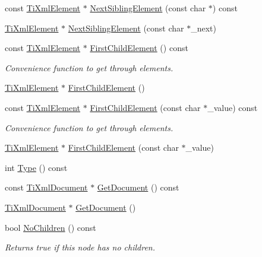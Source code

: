 \begin{DoxyCompactItemize}
\item 
const \hyperlink{class_ti_xml_element}{Ti\+Xml\+Element} $\ast$ \hyperlink{class_ti_xml_node_a3d7897999f99cf4870dd59df6331d7ff}{Next\+Sibling\+Element} (const char $\ast$) const 
\item 
\hyperlink{class_ti_xml_element}{Ti\+Xml\+Element} $\ast$ \hyperlink{class_ti_xml_node_a6e1ac6b800e18049bc75e9f8e63a8e5f}{Next\+Sibling\+Element} (const char $\ast$\+\_\+next)
\item 
const \hyperlink{class_ti_xml_element}{Ti\+Xml\+Element} $\ast$ \hyperlink{class_ti_xml_node_ab1f8d8e70d88aea4c5efedfe00862d55}{First\+Child\+Element} () const 
\begin{DoxyCompactList}\small\item\em Convenience function to get through elements. \end{DoxyCompactList}\item 
\hyperlink{class_ti_xml_element}{Ti\+Xml\+Element} $\ast$ \hyperlink{class_ti_xml_node_aa0fecff1f3866ab33a8a25506e95db1d}{First\+Child\+Element} ()
\item 
const \hyperlink{class_ti_xml_element}{Ti\+Xml\+Element} $\ast$ \hyperlink{class_ti_xml_node_a0ec361bfef1cf1978d060295f597e0d9}{First\+Child\+Element} (const char $\ast$\+\_\+value) const 
\begin{DoxyCompactList}\small\item\em Convenience function to get through elements. \end{DoxyCompactList}\item 
\hyperlink{class_ti_xml_element}{Ti\+Xml\+Element} $\ast$ \hyperlink{class_ti_xml_node_a6936ae323675071808ac4840379e57f5}{First\+Child\+Element} (const char $\ast$\+\_\+value)
\item 
int \hyperlink{class_ti_xml_node_a57b99d5c97d67a42b9752f5210a1ba5e}{Type} () const 
\item 
const \hyperlink{class_ti_xml_document}{Ti\+Xml\+Document} $\ast$ \hyperlink{class_ti_xml_node_aa66f4ebcd175204a168ed7c2d7b43071}{Get\+Document} () const 
\item 
\hyperlink{class_ti_xml_document}{Ti\+Xml\+Document} $\ast$ \hyperlink{class_ti_xml_node_a7b2372c0e7adfb32f5b6902fe49a39b2}{Get\+Document} ()
\item 
bool \hyperlink{class_ti_xml_node_aeed21ad30630ef6e7faf096127edc9f3}{No\+Children} () const 
\begin{DoxyCompactList}\small\item\em Returns true if this node has no children. \end{DoxyCompactList}\item 

\end{DoxyCompactItemize}
